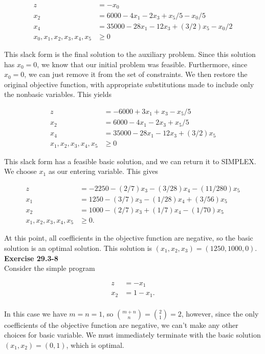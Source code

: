 \documentclass{article}
\begin{document}
\begin{align*}
z &= -x_0\\ 
x_2 & = 6000 - 4x_1 - 2x_3 + x_5/5 - x_0/5\\
x_4 &= 35000 - 28x_1 - 12x_3 + (3/2)x_5 - x_0/2\\
x_0,x_1,x_2,x_3,x_4,x_5 &\ge 0
\end{align*}

This slack form is the final solution to the auxiliary problem.  Since this solution has $x_0 = 0$, we know that our initial problem was feasible.  Furthermore, since $x_0=0$, we can just remove it from the set of constraints.  We then restore the original objective function, with appropriate substitutions made to include only the nonbasic variables.  This yields

\begin{align*}
z &= -6000 + 3x_1 + x_3 - x_5/5\\
x_2 & = 6000 - 4x_1 - 2x_3 + x_5/5\\
x_4 &= 35000 - 28x_1 - 12x_3 + (3/2)x_5 \\
x_1,x_2,x_3,x_4,x_5 &\ge 0
\end{align*}

This slack form has a feasible basic solution, and we can return it to SIMPLEX. We choose $x_1$ as our entering variable.  This gives

\begin{align*}
z &= -2250 - (2/7)x_3 - (3/28)x_4 - (11/280)x_5\\
x_1 &= 1250 - (3/7)x_3 - (1/28)x_4 + (3/56)x_5\\
x_2 &= 1000 - (2/7)x_3 + (1/7)x_4 - (1/70)x_5 \\
x_1,x_2,x_3,x_4,x_5 &\ge 0.
\end{align*}

At this point, all coefficients in the objective function are negative, so the basic solution is an optimal solution.  This solution is $(x_1, x_2, x_3) = (1250, 1000, 0)$. \\


\noindent\textbf{Exercise 29.3-8}\\

Consider the simple program

\begin{align*}
z &= -x_1\\
x_2 &= 1 - x_1. \\
\end{align*}

In this case we have $m = n = 1$, so ${m+n \choose n} = {2 \choose 1} = 2$, however, since the only coefficients of the objective function are negative, we can't make any other choices for basic variable.  We must immediately terminate with the basic solution $(x_1,x_2) = (0,1)$, which is optimal. \\
\end{document}
